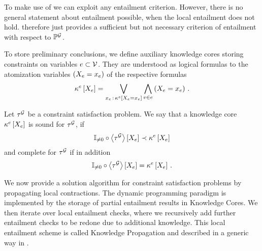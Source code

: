 \begin{remark}
    To make use of  we can exploit any entailment criterion.
    However, there is no general statement about entailment possible, when the local entailment does not hold.
     therefore just provides a sufficient but not necessary criterion of entailment with respect to $\mathbb{P}^{\mathcal{G}}$.
\end{remark}


To store preliminary conclusions, we define auxiliary knowledge cores storing constraints on variables $e\subset\mathcal{V}$.
They are understood as logical formulas to the atomization variables $\left(X_{e}=x_{e}\right)$ of the respective formulas
\begin{align*}
    \kappa^{e}\left[X_{e}\right]
    = \bigvee_{x_{e} \, : \, \kappa^{e}\left[X_{e}=x_{e}\right]} \bigwedge_{v\in e} \left(X_{e}=x_{e}\right) \, .
\end{align*}

\begin{definition}\label{def:knowledgeCoreSoundComplete}
    Let $\tau^{\mathcal{G}}$ be a constraint satisfaction problem. %
    We say that a knowledge core $\kappa^{e}\left[X_{e}\right]$ is sound for $\tau^{\mathcal{G}}$, if
    \begin{align*}
        \mathbb{I}_{\neq0}\circ\left\langle \tau^{\mathcal{G}}\right\rangle \left[ X_{e} \right]  \prec \kappa^{e}\left[X_{e}\right]
    \end{align*}
    and complete for $\tau^{\mathcal{G}}$ if in addition
    \begin{align*}
        \mathbb{I}_{\neq0}\circ\left\langle \tau^{\mathcal{G}}\right\rangle \left[ X_{e} \right]=\kappa^{e}\left[X_{e}\right] \, .
    \end{align*}
\end{definition}



We now provide a solution algorithm for constraint satisfaction problems by propagating local contractions.
The dynamic programming paradigm is implemented by the storage of partial entailment results in Knowledge Cores.
We then iterate over local entailment checks, where we recursively add further entailment checks to be redone due to additional knowledge.
This local entailment scheme is called Knowledge Propagation and described in a generic way in .

